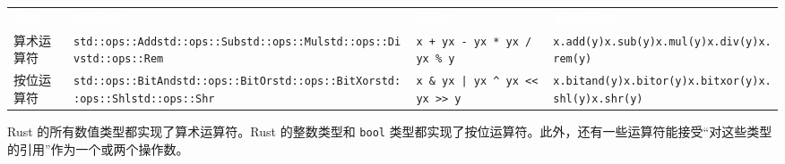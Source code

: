 \myTableBegin
\begin{tabularx}{\textwidth}{@{}>{\hsize=0.303\hsize\raggedright\arraybackslash}X>{\hsize=1.232\hsize\raggedright\arraybackslash}X>{\hsize=1.232\hsize\raggedright\arraybackslash}X>{\hsize=1.232\hsize\raggedright\arraybackslash}X@{}}
\rowcolor{tabhead}\textcolor{white}{类别} & \textcolor{white}{特型名称} & \textcolor{white}{表达式} & \textcolor{white}{等效表达式} \\
算术运算符 & \texttt{std::ops::Add}\newline{}\texttt{std::ops::Sub}\newline{}\texttt{std::ops::Mul}\newline{}\texttt{std::ops::Div}\newline{}\texttt{std::ops::Rem} & \texttt{x + y}\newline{}\texttt{x - y}\newline{}\texttt{x * y}\newline{}\texttt{x / y}\newline{}\texttt{x \% y} & \texttt{x.add(y)}\newline{}\texttt{x.sub(y)}\newline{}\texttt{x.mul(y)}\newline{}\texttt{x.div(y)}\newline{}\texttt{x.rem(y)} \\
按位运算符 & \texttt{std::ops::BitAnd}\newline{}\texttt{std::ops::BitOr}\newline{}\texttt{std::ops::BitXor}\newline{}\texttt{std::ops::Shl}\newline{}\texttt{std::ops::Shr} & \texttt{x \& y}\newline{}\texttt{x | y}\newline{}\texttt{x \textasciicircum{} y}\newline{}\texttt{x << y}\newline{}\texttt{x >> y} & \texttt{x.bitand(y)}\newline{}\texttt{x.bitor(y)}\newline{}\texttt{x.bitxor(y)}\newline{}\texttt{x.shl(y)}\newline{}\texttt{x.shr(y)} \\
\end{tabularx}
\myTableEnd

Rust 的所有数值类型都实现了算术运算符。Rust 的整数类型和 \texttt{bool} 类型都实现了按位运算符。此外，还有一些运算符能接受“对这些类型的引用”作为一个或两个操作数。


